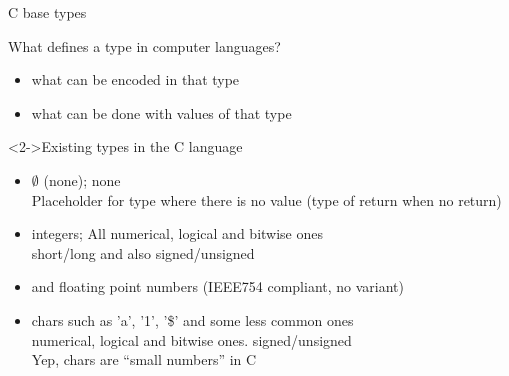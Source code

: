 \begin{Coupe}
\begin{frame}{C base types}
  \begin{block}{What defines a type in computer languages?}
    \begin{itemize}
    \item {} what can be encoded in that type
    \item {} what can be done with values of that type
    \end{itemize}
  \end{block}\vspace{-.6\baselineskip}

  \begin{block}<2->{Existing types in the C language}
    \begin{itemize}
    \item \textbf{\large{}}  $\emptyset$ (none);
       none\\
      Placeholder for type where there is no value (type of return when no return)
    \item \textbf{\large{}}  integers;
       All numerical, logical and bitwise ones\\
        short/long and also signed/unsigned
    \item \textbf{\large{}} and
      \textbf{\large{}}
      floating point numbers (IEEE754 compliant, no variant)
    \item \textbf{\large{}}  chars such as
      'a', '1', '\$' and some less common ones\\
       numerical, logical and bitwise
      ones.  signed/unsigned\\
      Yep, chars are ``small numbers'' in C


\end{itemize}
\end{block}
\end{frame}
\end{Coupe}
